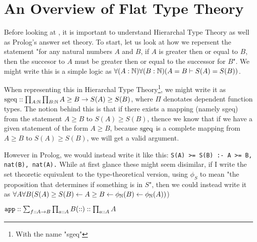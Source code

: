 \section{An Overview of Flat Type Theory}

Before looking at \this, it is important to understand Hierarchal Type Theory as well as Prolog's answer set theory.
To start, let us look at how we repersent the statement "for any natural numbers $A$ and $B$, if $A$ is greater then or equal to $B$, then the succesor to $A$ must be greater then or equal to the successor for $B$".
We might write this is a simple logic as $\forall (A : \mathbb{N}) \forall (B : \mathbb{N}) (A = B \vdash S(A) = S(B))$.

When representing this in Hierarchal Type Theory\footnote{With the name "sgeq"}, we might write it as $\operatorname{sgeq} :: \prod_{A : \mathbb{N}} \prod_{B : \mathbb{N}} A \geq B \to S(A) \geq S(B)$, where $\Pi$ denotates dependent function types.
The notion behind this is that if there exists a mapping (namely sgeq) from the statement $A \geq B$ to $S(A) \geq S(B)$, thence we know that if we have a given statement of the form $A \geq B$, because $\operatorname{sgeq}$ is a complete mapping from $A \geq B$ to $S(A) \geq S(B)$, we will get a valid argument.

However in Prolog, we would instead write it like this: \verb|S(A) >= S(B) :- A >= B, nat(B), nat(A).|
While at first glance these might seem disimilar, if I write the set theoretic equivalent to the type-theoretical version, using $\phi_S$ to mean "the proposition that determines if something is in $S$", then we could instead write it as $\forall A \forall B (S(A) \geq S(B) \leftarrow A \geq B \leftarrow \phi_{\mathbb{N}} (B) \leftarrow \phi_{\mathbb{N}} (A)) $)

\begin{math}
	\mathtt{app} :: \sum_{f :: A \to B} \prod_{a :: A} B \\
	(::) :: \prod_{a::A} A
\end{math}